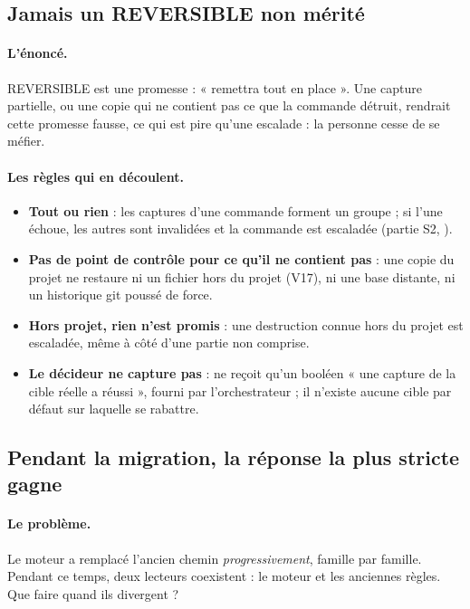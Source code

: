 \subsection{Jamais un REVERSIBLE non mérité}
\label{sec:jamais-reversible}

\paragraph{L'énoncé.} REVERSIBLE est une promesse : «  remettra tout en
place ». Une capture partielle, ou une copie qui ne contient pas ce que la commande détruit,
rendrait cette promesse fausse, ce qui est pire qu'une escalade : la personne cesse de se
méfier.

\paragraph{Les règles qui en découlent.}
\begin{itemize}
  \item \textbf{Tout ou rien} : les captures d'une commande forment un groupe ; si l'une échoue,
    les autres sont invalidées et la commande est escaladée (partie S2,
    ).
  \item \textbf{Pas de point de contrôle pour ce qu'il ne contient pas} : une copie du projet
    ne restaure ni un fichier hors du projet (V17), ni une base distante, ni un historique
    git poussé de force.
  \item \textbf{Hors projet, rien n'est promis} : une destruction connue hors du projet est
    escaladée, même à côté d'une partie non comprise.
  \item \textbf{Le décideur ne capture pas} :  ne reçoit qu'un booléen « une
    capture de la cible réelle a réussi », fourni par l'orchestrateur ; il n'existe aucune
    cible par défaut sur laquelle se rabattre.
\end{itemize}

\subsection{Pendant la migration, la réponse la plus stricte gagne}
\label{sec:plus-strict}

\paragraph{Le problème.} Le moteur a remplacé l'ancien chemin \emph{progressivement}, famille
par famille. Pendant ce temps, deux lecteurs coexistent : le moteur et les anciennes règles.
Que faire quand ils divergent ?


